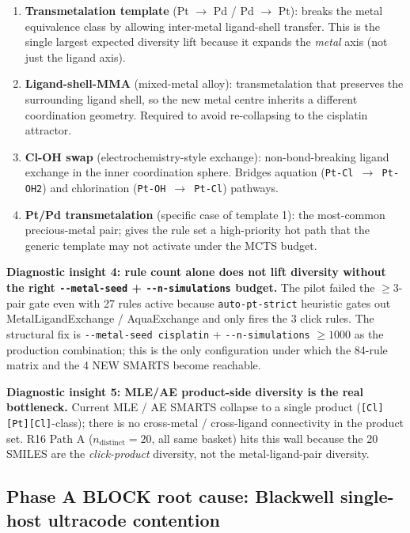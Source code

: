 \begin{enumerate}
  \item \textbf{Transmetalation template} (Pt $\to$ Pd / Pd $\to$ Pt):
        breaks the metal equivalence class by allowing
        inter-metal ligand-shell transfer.  This is the single
        largest expected diversity lift because it expands the
        \emph{metal} axis (not just the ligand axis).
  \item \textbf{Ligand-shell-MMA} (mixed-metal alloy):
        transmetalation that preserves the surrounding ligand
        shell, so the new metal centre inherits a different
        coordination geometry.  Required to avoid
        re-collapsing to the cisplatin attractor.
  \item \textbf{Cl-OH swap} (electrochemistry-style exchange):
        non-bond-breaking ligand exchange in the
        inner coordination sphere.  Bridges aquation
        (\texttt{Pt-Cl $\to$ Pt-OH2}) and chlorination
        (\texttt{Pt-OH $\to$ Pt-Cl}) pathways.
  \item \textbf{Pt/Pd transmetalation} (specific case of template 1):
        the most-common precious-metal pair; gives the rule
        set a high-priority hot path that the generic template
        may not activate under the MCTS budget.
\end{enumerate}

\textbf{Diagnostic insight 4: rule count alone does not lift
diversity without the right \texttt{-{}-metal-seed} +
\texttt{-{}-n-simulations} budget.}  The pilot failed the
$\geq 3$-pair gate even with 27 rules active because
\texttt{auto-pt-strict} heuristic gates out
MetalLigandExchange / AquaExchange and only fires the 3 click
rules.  The structural fix is \texttt{-{}-metal-seed cisplatin} +
\texttt{-{}-n-simulations} $\geq 1000$ as the production
combination; this is the only configuration under which the
84-rule matrix and the 4 NEW SMARTS become reachable.

\textbf{Diagnostic insight 5: MLE/AE product-side diversity is the
real bottleneck.}  Current MLE / AE SMARTS collapse to a single
product (\texttt{[Cl][Pt][Cl]}-class); there is no cross-metal /
cross-ligand connectivity in the product set.  R16 Path A
($n_{\mathrm{distinct}}{=}20$, all same basket) hits this wall
because the 20 SMILES are the \emph{click-product} diversity, not
the metal-ligand-pair diversity.

\subsection{Phase A BLOCK root cause: Blackwell single-host ultracode contention}
\label{sec:honest-negative:phase-a-block}

